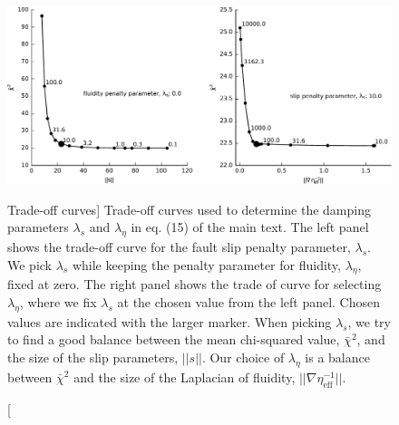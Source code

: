 \begin{figure}
\noindent\includegraphics[scale=0.9]{ch3/figures/2016jb013114-fS01}
\caption
[Trade-off curves]
{Trade-off curves used to determine the damping parameters
$\lambda_s$ and $\lambda_\eta$ in eq.  (15) of the main text.  The
left panel shows the trade-off curve for the fault slip penalty
parameter, $\lambda_s$.  We pick $\lambda_s$ while keeping the penalty
parameter for fluidity, $\lambda_\eta$, fixed at zero.  The right
panel shows the trade of curve for selecting $\lambda_\eta$, where we
fix $\lambda_s$ at the chosen value from the left panel. Chosen values
are indicated with the larger marker.  When picking $\lambda_s$, we
try to find a good balance between the mean chi-squared value,
$\bar{\chi}^2$, and the size of the slip parameters, $||s||$.  Our
choice of $\lambda_\eta$ is a balance between $\bar{\chi}^2$ and the
size of the Laplacian of fluidity, $||\nabla
\eta_\mathrm{eff}^{-1}||$.}
\label{ch3:fig:S1}
\end{figure}

